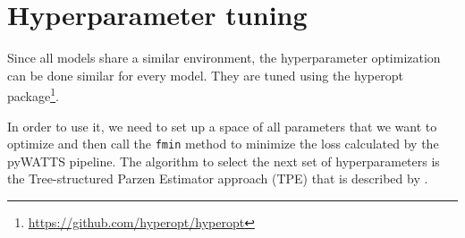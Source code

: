 \section{Hyperparameter tuning}

Since all models share a similar environment, the 
hyperparameter optimization can be done similar for every model.
They are tuned using the 
hyperopt package\footnote{\url{https://github.com/hyperopt/hyperopt}}.

In order to use it, we need to set up a space of 
all parameters that we want to optimize and 
then call the \texttt{fmin} method to minimize the loss 
calculated by the pyWATTS pipeline. 
The algorithm to select the next set of hyperparameters is 
the Tree-structured Parzen Estimator approach (TPE) 
that is described by \Textcite{Bergstra2011}.